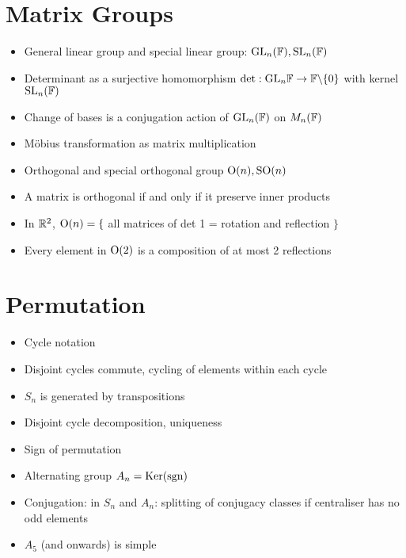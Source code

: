 \section{Matrix Groups}
\begin{itemize}
      \item General linear group and special linear group: $\mathrm{GL}_n(\mathbb{F}), \mathrm{SL}_n(\mathbb{F})$
      \item Determinant as a surjective homomorphism $\det : \mathrm{GL}_n{\mathbb{F}} \to \mathbb{F}\backslash\{0\}$ with kernel $\mathrm{SL}_n(\mathbb{F})$
      \item Change of bases is a conjugation action of $\mathrm{GL}_n(\mathbb{F})$ on $M_n(\mathbb{F})$
      \item Möbius transformation as matrix multiplication
      \item Orthogonal and special orthogonal group $\mathrm{O}(n), \mathrm{SO} (n)$
      \item A matrix is orthogonal if and only if it preserve inner products
      \item In $\mathbb{R}^2$, $\mathrm{O}(n) = \{$ all matrices of det 1 = rotation and reflection $\}$
      \item Every element in $\mathrm{O}(2)$ is a composition of at most 2 reflections
\end{itemize}

\section{Permutation}
\begin{itemize}
      \item Cycle notation
      \item Disjoint cycles commute, cycling of elements within each cycle
      \item $S_n$ is generated by transpositions
      \item Disjoint cycle decomposition, uniqueness
      \item Sign of permutation
      \item Alternating group $A_n = \operatorname{Ker}(\operatorname{sgn})$
      \item Conjugation: in $S_n$ and $A_n$: splitting of conjugacy classes if centraliser has no odd elements
      \item $A_5$ (and onwards) is simple
\end{itemize}




